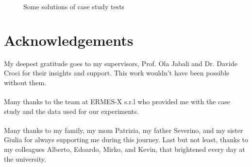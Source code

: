 \documentclass[11pt,a4paper,twocolumn]{article}
\begin{document}
\begin{figure}
    \caption{Some solutions of case study tests}
\end{figure}
\section{Acknowledgements}
My deepest gratitude goes to my supervisors, Prof. Ola Jabali and Dr. Davide Croci for their insights and support.
This work wouldn't have been possible without them.\\
\\
Many thanks to the team at ERMES-X s.r.l who provided me with the case study and the data used for our experiments.\\
\\
Many thanks to my family, my mom Patrizia, my father Severino, and my sister Giulia for always supporting me during this journey.
Last but not least, thanks to my colleagues Alberto, Edoardo, Mirko, and Kevin, that brightened every day at the university.

\end{document}
